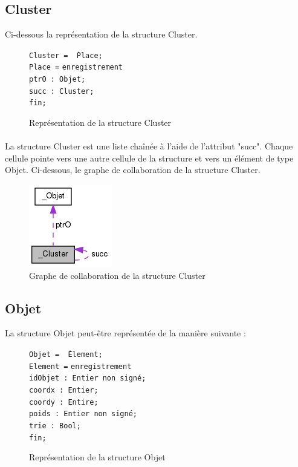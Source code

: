 \documentclass[twoside,UTF8]{EPURapport}
\begin{document}
\subsection{Cluster}

Ci-dessous la représentation de la structure Cluster. 
\begin{figure}[H]

\begin{tabbing}
\texttt{Cluster = \^\,Place;} \\
\texttt{Place =} \= \texttt{enregistrement} \\
\> \texttt{ptrO : Objet;} \\
\> \texttt{succ : Cluster;} \\
\> \texttt{fin;}\\
\end{tabbing}

\caption{Représentation de la structure Cluster}
\end{figure}

\paragraph{}
La structure Cluster est une liste cha\^inée à l'aide de l'attribut "succ". Chaque cellule pointe vers une autre cellule de la structure et vers un élément de type Objet.
Ci-dessous, le graphe de collaboration de la structure Cluster.  

\begin{figure}[H]
\center
\includegraphics[scale=0.5]{images/struct_cluster.png}
\caption{Graphe de collaboration de la structure Cluster}
\end{figure} 

\subsection{Objet}
\label{subsec:Objet.h}
La structure Objet peut-\^etre représentée de la manière suivante : 
\begin{figure}[H]
\begin{tabbing}
\texttt{Objet = \^\,Element;}\\
\texttt{Element =} \= \texttt{enregistrement}\\
\> \texttt{idObjet : Entier non signé;} \\
\> \texttt{coordx : Entier;} \\
\> \texttt{coordy : Entire;} \\
\> \texttt{poids : Entier non signé;} \\
\> \texttt{trie : Bool;} \\
\> \texttt{fin;}\\
\end{tabbing}

\caption{Représentation de la structure Objet}
\end{figure}
\end{document}
